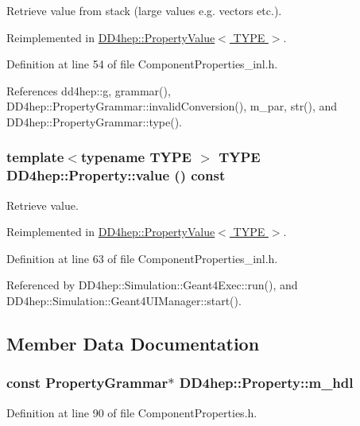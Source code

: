 Retrieve value from stack (large values e.g. vectors etc.). 

Reimplemented in \hyperlink{class_d_d4hep_1_1_property_value_a6d455c08f342459a3f372279c4b9ce09}{DD4hep::PropertyValue$<$ TYPE $>$}.

Definition at line 54 of file ComponentProperties\_\-inl.h.

References dd4hep::g, grammar(), DD4hep::PropertyGrammar::invalidConversion(), m\_\-par, str(), and DD4hep::PropertyGrammar::type().\hypertarget{class_d_d4hep_1_1_property_a8aa2bfdecfc6cdb06c4f8c1cf7a01600}{
\subsubsection[{value}]{\setlength{\rightskip}{0pt plus 5cm}template$<$typename TYPE $>$ TYPE DD4hep::Property::value () const}}
\label{class_d_d4hep_1_1_property_a8aa2bfdecfc6cdb06c4f8c1cf7a01600}


Retrieve value. 

Reimplemented in \hyperlink{class_d_d4hep_1_1_property_value_a4a0c43ad417f9dd13c618625bac0fb9b}{DD4hep::PropertyValue$<$ TYPE $>$}.

Definition at line 63 of file ComponentProperties\_\-inl.h.

Referenced by DD4hep::Simulation::Geant4Exec::run(), and DD4hep::Simulation::Geant4UIManager::start().

\subsection{Member Data Documentation}
\hypertarget{class_d_d4hep_1_1_property_acae0b73848d2a5c87ff18ef6b564b123}{
\subsubsection[{m\_\-hdl}]{\setlength{\rightskip}{0pt plus 5cm}const {\bf PropertyGrammar}$\ast$ {\bf DD4hep::Property::m\_\-hdl}}}
\label{class_d_d4hep_1_1_property_acae0b73848d2a5c87ff18ef6b564b123}


Definition at line 90 of file ComponentProperties.h.

